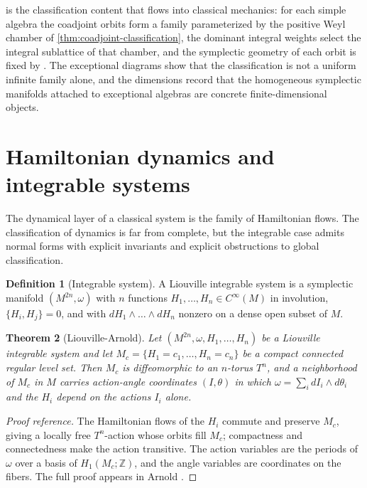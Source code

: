 \documentclass[11pt,letterpaper]{article}
\newtheorem{theorem}{Theorem}[section]
\theoremstyle{definition}
\newtheorem{definition}[theorem]{Definition}
\theoremstyle{remark}
\begin{document}
 is the classification content that flows into classical mechanics: for each simple algebra the coadjoint orbits form a family parameterized by the positive Weyl chamber of \cref{thm:coadjoint-classification}, the dominant integral weights select the integral sublattice of that chamber, and the symplectic geometry of each orbit is fixed by . The exceptional diagrams show that the classification is not a uniform infinite family alone, and the dimensions record that the homogeneous symplectic manifolds attached to exceptional algebras are concrete finite-dimensional objects.

\section{Hamiltonian dynamics and integrable systems}

The dynamical layer of a classical system is the family of Hamiltonian flows. The classification of dynamics is far from complete, but the integrable case admits normal forms with explicit invariants and explicit obstructions to global classification.

\begin{definition}[Integrable system]
\label{def:integrable}
A Liouville integrable system is a symplectic manifold $(M^{2n}, \omega)$ with $n$ functions $H_1, \dots, H_n \in C^{\infty}(M)$ in involution, $\{H_i, H_j\} = 0$, and with $dH_1 \wedge \dots \wedge dH_n$ nonzero on a dense open subset of $M$.
\end{definition}

\begin{theorem}[Liouville-Arnold]
\label{thm:liouville-arnold}
Let $(M^{2n}, \omega, H_1, \dots, H_n)$ be a Liouville integrable system and let $M_c = \{ H_1 = c_1, \dots, H_n = c_n \}$ be a compact connected regular level set. Then $M_c$ is diffeomorphic to an $n$-torus $T^{n}$, and a neighborhood of $M_c$ in $M$ carries action-angle coordinates $(I, \theta)$ in which $\omega = \sum_{i} dI_i \wedge d\theta_i$ and the $H_i$ depend on the actions $I_i$ alone.
\end{theorem}

\begin{proof}[Proof reference]
The Hamiltonian flows of the $H_i$ commute and preserve $M_c$, giving a locally free $T^{n}$-action whose orbits fill $M_c$; compactness and connectedness make the action transitive. The action variables are the periods of $\omega$ over a basis of $H_1(M_c; \mathbb{Z})$, and the angle variables are coordinates on the fibers. The full proof appears in Arnold \cite{arnold}.
\end{proof}
\end{document}
